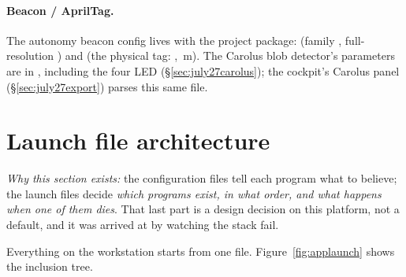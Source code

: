 \paragraph{Beacon / AprilTag.} The autonomy beacon config lives with the
project package: 
(family , full-resolution ) and
 (the physical tag: , \,m).
The Carolus blob detector's parameters are in
, including the four
LED  (\S\ref{sec:july27carolus}); the cockpit's Carolus
panel (\S\ref{sec:july27export}) parses this same file.

\section{Launch file architecture}
\label{ap:repro-launcharch}
\emph{Why this section exists:} the configuration files tell each program what
to believe; the launch files decide \emph{which programs exist, in what order,
and what happens when one of them dies}. That last part is a design decision on
this platform, not a default, and it was arrived at by watching the stack fail.

Everything on the workstation starts from one file. Figure~\ref{fig:applaunch}
shows the inclusion tree.

